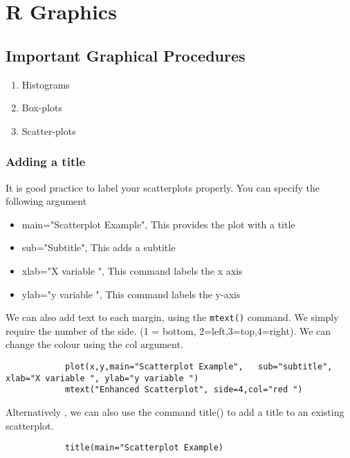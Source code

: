 	\chapter { R Graphics}
	
	\section{Important Graphical Procedures}
	\begin{enumerate}
		\item Histograms
		\item Box-plots
		\item Scatter-plots
	\end{enumerate}
	
	
	
	
			
			\subsection{Adding a title }
			
			It is good practice to label your scatterplots properly. You can specify the following argument
			\begin{itemize}
				\item	main="Scatterplot Example", 	This provides the plot with a title
				\item	sub="Subtitle",                 This adds a subtitle
				\item	xlab="X variable ",				This command labels the x axis 
				\item   ylab="y variable ",				This command labels the y-axis
			\end{itemize}
			We can also add text to each margin, using the \texttt{mtext()} command.  
			We simply require the number of the side. (1 = bottom, 2=left,3=top,4=right). 
			We can change the colour using the col argument.
			\footnotesize \begin{verbatim}
			plot(x,y,main="Scatterplot Example",   sub="subtitle",    xlab="X variable ", ylab="y variable ")	
			mtext("Enhanced Scatterplot", side=4,col="red ")
			\end{verbatim}\normalsize
			Alternatively , we can also use the command title() to add a title to an existing scatterplot.
			\footnotesize \begin{verbatim}
			title(main="Scatterplot Example)	
			\end{verbatim}\normalsize
			
